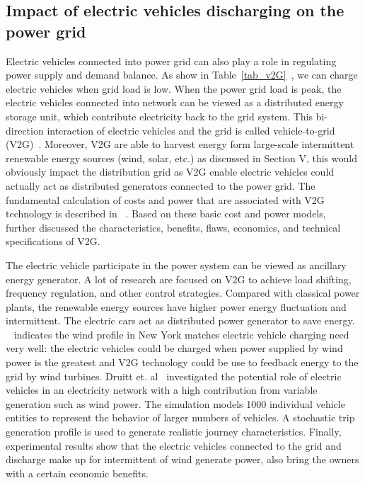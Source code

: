 \subsection{Impact of electric vehicles discharging on the power grid}

Electric vehicles connected into power grid can also play a role in regulating power supply and demand balance. 
As show in Table~\ref{tab_v2G}~\cite{YC_Green,YC_Acha}, we can charge electric vehicles when grid load is low. 
When the power grid load is peak, the electric vehicles connected into network can be viewed as a distributed energy storage unit, which contribute electricity back to the grid system. 
This bi-direction interaction of electric vehicles and the grid is called vehicle-to-grid (V2G)~\cite{YC_V2Gconcept1,YC_V2Gconcept2}.
Moreover, V2G are able to harvest energy form large-scale intermittent renewable energy sources (wind, solar, etc.) as discussed in Section V, this would obviously impact the distribution grid as V2G enable electric vehicles could actually act as distributed generators connected to the power grid.
The fundamental calculation of costs and power that are associated with V2G technology is described in ~\cite{YC_V2Gconcept1}. 
Based on these basic cost and power models, ~\cite{YC_Reid,YC_Sutanto,YC_Brooks} further discussed the characteristics, benefits, flaws, economics, and technical specifications of V2G. 

The electric vehicle participate in the power system can be viewed as ancillary energy generator. 
A lot of research are focused on V2G to achieve load shifting, frequency regulation, and other control
strategies. 
Compared with classical power plants, the renewable energy sources have higher power energy fluctuation and intermittent.
The electric cars act as distributed power generator to save energy.
~\cite{YC_newyork} indicates the wind profile in New York matches electric vehicle charging need very well: the electric vehicles could be charged when power supplied by wind power is the greatest and V2G technology could be use to feedback energy to the grid by wind turbines.
Druitt et. al~\cite{YC_DRUITT2012104} investigated the potential role of electric vehicles in an electricity network with a high contribution from variable generation such as wind power. The simulation models 1000 individual vehicle entities to represent the behavior of larger numbers of vehicles. 
A stochastic trip generation profile is used to generate realistic journey characteristics. 
Finally, experimental results show that the electric vehicles connected to the grid and discharge make up for intermittent of wind generate power, also bring the owners with a certain economic benefits.

